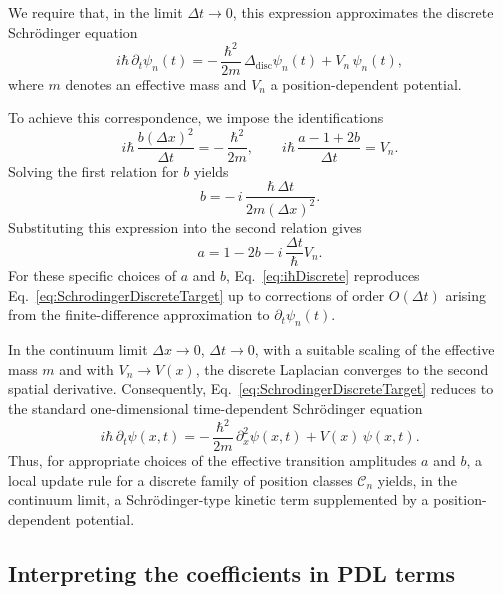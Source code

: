 \documentclass[11pt,a4paper]{article}
\begin{document}
We require that, in the limit $\Delta t\to 0$, this expression approximates the discrete Schr\"odinger equation
\begin{equation}
i\hbar\,\partial_t \psi_n(t) 
= -\,\frac{\hbar^{2}}{2m}\,\Delta_{\mathrm{disc}}\psi_n(t) + V_n\,\psi_n(t),
\label{eq:SchrodingerDiscreteTarget}
\end{equation}
where $m$ denotes an effective mass and $V_n$ a position-dependent potential.\par 
To achieve this correspondence, we impose the identifications
\begin{equation}
i\hbar\,\frac{b(\Delta x)^2}{\Delta t} = -\,\frac{\hbar^{2}}{2m},
\qquad
i\hbar\,\frac{a-1+2b}{\Delta t} = V_n.
\label{eq:abIdentifications}
\end{equation}
Solving the first relation for $b$ yields
\begin{equation}
b = -\,i\,\frac{\hbar\,\Delta t}{2m(\Delta x)^2}.
\end{equation}
Substituting this expression into the second relation gives
\begin{equation}
a = 1 - 2b - i\,\frac{\Delta t}{\hbar} V_n.
\end{equation}
For these specific choices of $a$ and $b$, Eq.~\eqref{eq:iħDiscrete} reproduces Eq.~\eqref{eq:SchrodingerDiscreteTarget} up to corrections of order $O(\Delta t)$ arising from the finite-difference approximation to $\partial_t \psi_n(t)$.\par 
In the continuum limit $\Delta x \to 0$, $\Delta t \to 0$, with a suitable scaling of the effective mass $m$ and with $V_n\to V(x)$, the discrete Laplacian converges to the second spatial derivative. Consequently, Eq.~\eqref{eq:SchrodingerDiscreteTarget} reduces to the standard one-dimensional time-dependent Schr\"odinger equation
\begin{equation}
i\hbar\,\partial_t \psi(x,t) 
= -\,\frac{\hbar^{2}}{2m}\,\partial_x^{2}\psi(x,t) + V(x)\,\psi(x,t).
\end{equation}
Thus, for appropriate choices of the effective transition amplitudes $a$ and $b$, a local update rule for a discrete family of position classes $\mathcal{C}_n$ yields, in the continuum limit, a Schr\"odinger-type kinetic term supplemented by a position-dependent potential.

\subsection{Interpreting the coefficients in PDL terms}
\end{document}
